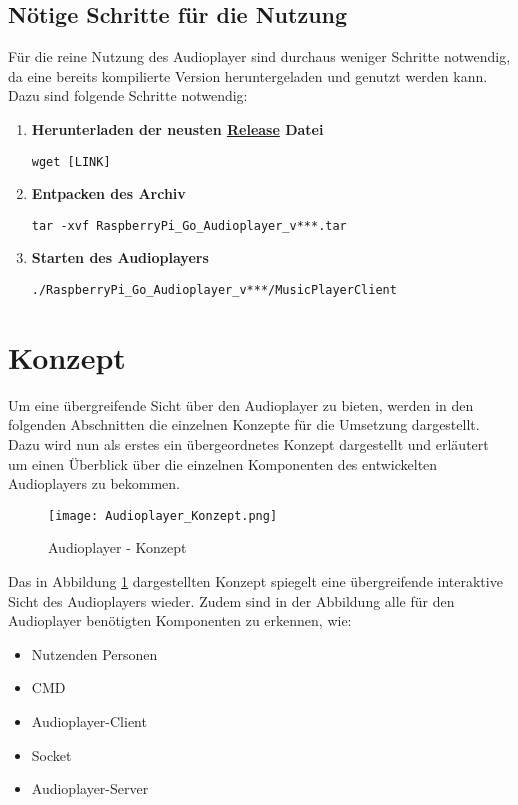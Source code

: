 \subsection{Nötige Schritte für die Nutzung}
Für die reine Nutzung des Audioplayer sind durchaus weniger Schritte notwendig, da eine bereits kompilierte Version heruntergeladen und genutzt werden kann.
Dazu sind folgende Schritte notwendig:
\begin{enumerate}
\item \textbf{Herunterladen der neusten \href{https://github.com/alexanderklapdor/RaspberryPi_Go_Audioplayer/releases}{Release} Datei}  \\
\begin{lstlisting}
wget [LINK]
\end{lstlisting}

\item \textbf{Entpacken des Archiv} \\
\begin{lstlisting}
tar -xvf RaspberryPi_Go_Audioplayer_v***.tar
\end{lstlisting}

\item \textbf{Starten des Audioplayers} \\
\begin{lstlisting}
./RaspberryPi_Go_Audioplayer_v***/MusicPlayerClient
\end{lstlisting}
\end{enumerate}

\section{Konzept}
Um eine übergreifende Sicht über den Audioplayer zu bieten, werden in den folgenden Abschnitten die einzelnen Konzepte für die Umsetzung dargestellt. Dazu wird nun als erstes ein übergeordnetes Konzept dargestellt und erläutert um einen Überblick über die einzelnen Komponenten des entwickelten Audioplayers zu bekommen.

\begin{figure}[h]
	\centering
	\texttt{[image: Audioplayer\_Konzept.png]}
	\caption{Audioplayer - Konzept}
	\label{img:Konzept-Audioplayer}
\end{figure}

Das in Abbildung \ref{img:Konzept-Audioplayer} dargestellten Konzept spiegelt eine übergreifende interaktive Sicht des Audioplayers wieder. Zudem sind in der Abbildung alle für den Audioplayer benötigten Komponenten zu erkennen, wie:
\begin{itemize}
\item Nutzenden Personen
\item \ac{CMD}
\item Audioplayer-Client
\item Socket
\item Audioplayer-Server
\end{itemize}

